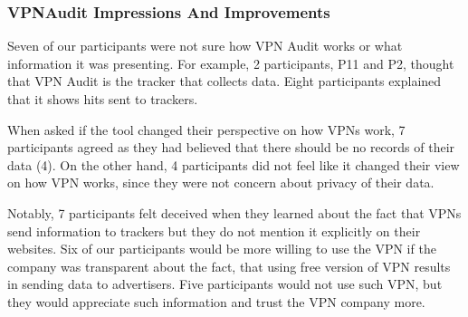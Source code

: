 \subsubsection{VPNAudit Impressions And Improvements} 

Seven of our participants were not sure how VPN Audit works or what
information it was presenting. For example, 2 participants, P11 and P2,
thought that VPN Audit is the tracker that collects data. Eight participants
explained that it shows hits sent to trackers. 

When asked if the tool changed their perspective on how VPNs work, 7
participants agreed as they had believed that there should be no records of
their data (4). On the other hand, 4 participants did not feel like it changed
their view on how VPN works, since they were not concern about privacy of
their data.

Notably, 7 participants felt deceived when they learned about the fact that
VPNs send information to trackers but they do not mention it explicitly on
their websites. Six of our participants would be more willing to use the VPN
if the company was transparent about the fact, that using free version of VPN
results in sending data to advertisers. Five participants would not use such
VPN, but they would appreciate such information and trust the VPN company
more. 


